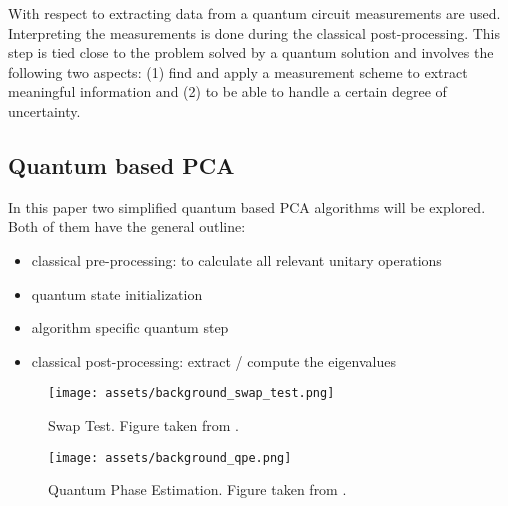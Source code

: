 With respect to extracting data from a quantum circuit measurements are used. Interpreting the measurements is done during the classical post-processing. This step is tied close to the problem solved by a quantum solution and involves the following two aspects: (1) find and apply a measurement scheme to extract meaningful information and (2) to be able to handle a certain degree of uncertainty. \cite[p. 5]{Daski_2015}\cite{Qtb_Measu}

\subsection{Quantum based PCA}
\label{subsec:qpca}
In this paper two simplified quantum based PCA algorithms will be explored. Both of them have the general outline:
\begin{itemize}
  \item classical pre-processing: to calculate all relevant unitary operations
  \item quantum state initialization
  \item algorithm specific quantum step
  \item classical post-processing: extract / compute the eigenvalues
\end{itemize}

\begin{figure}
  \centering
  \texttt{[image: assets/background\_swap\_test.png]}
  \caption{Swap Test. Figure taken from \cite{Wp_Swap_File}.}
  \label{fig:swap_test}
\end{figure}

\begin{figure}
  \centering
  \texttt{[image: assets/background\_qpe.png]}
  \caption{Quantum Phase Estimation. Figure taken from \cite{Wp_QPE_File}.}
  \label{fig:qpe}
\end{figure}

